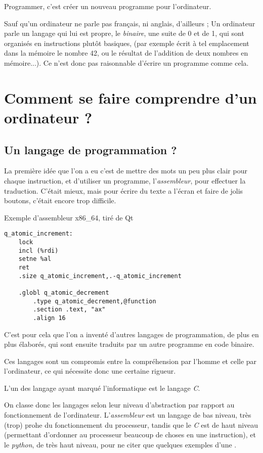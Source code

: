 Programmer, c'est créer un nouveau programme pour l'ordinateur.

Sauf qu'un ordinateur ne parle pas français, ni anglais, d'ailleurs ; Un ordinateur parle un
langage qui lui est propre, le \emph{binaire}, une suite de 0 et de 1, qui sont organisés en
instructions plutôt basiques, (par exemple écrit à tel emplacement dans la mémoire le
nombre 42, ou le résultat de l'addition de deux nombres en mémoire...). Ce n'est donc pas
raisonnable d'écrire un programme comme cela.
\section{Comment se faire comprendre d'un ordinateur ?}
\subsection{Un langage de programmation ?}
La première idée que l'on a eu c'est de mettre des mots un peu plus clair pour chaque
instruction, et d'utiliser un programme, l'\emph{assembleur}, pour effectuer la traduction. C'était
mieux, mais pour écrire du texte a l'écran et faire de jolis boutons, c'était encore trop
difficile.
\begin{listing}[h]
\caption{Exemple d'assembleur x86\_64, tiré de Qt}
\begin{verbatim}
q_atomic_increment:
    lock
    incl (%rdi)
    setne %al
    ret
    .size q_atomic_increment,.-q_atomic_increment

    .globl q_atomic_decrement
        .type q_atomic_decrement,@function
        .section .text, "ax"
        .align 16
\end{verbatim}
\end{listing}

C'est pour cela que l'on a inventé d'autres langages de programmation, de plus en plus
élaborés, qui sont ensuite traduits par un autre programme en code binaire.

Ces langages sont un compromis entre la compréhension par l'homme et celle par l'ordinateur, ce qui nécessite donc une certaine rigueur.

L'un des langage ayant marqué l'informatique est le langage \emph{C}.

On classe donc les langages selon leur niveau d'abstraction par rapport au
fonctionnement de l'ordinateur. L'\emph{assembleur} est un langage de bas niveau, très (trop)
prohe du fonctionnement du processeur, tandis que le \emph{C} est de haut niveau (permettant
d'ordonner au processeur beaucoup de choses en une instruction), et le \emph{python}, de très
haut niveau, pour ne citer que quelques exemples d'une 
.

